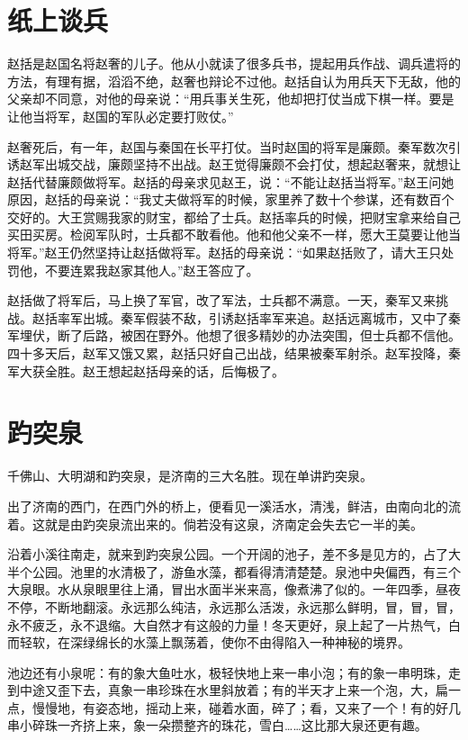 \documentclass[12pt,UTF-8,openany]{ctexbook}
\begin{document}
\chapter{纸上谈兵}

\begin{large}
    
    赵括是赵国名将赵奢的儿子。他从小就读了很多兵书，提起用兵作战、调兵遣将的方法，有理有据，滔滔不绝，赵奢也辩论不过他。赵括自认为用兵天下无敌，他的父亲却不同意，对他的母亲说：“用兵事关生死，他却把打仗当成下棋一样。要是让他当将军，赵国的军队必定要打败仗。”
    
    赵奢死后，有一年，赵国与秦国在长平打仗。当时赵国的将军是廉颇。秦军数次引诱赵军出城交战，廉颇坚持不出战。赵王觉得廉颇不会打仗，想起赵奢来，就想让赵括代替廉颇做将军。赵括的母亲求见赵王，说：“不能让赵括当将军。”赵王问她原因，赵括的母亲说：“我丈夫做将军的时候，家里养了数十个参谋，还有数百个交好的。大王赏赐我家的财宝，都给了士兵。赵括率兵的时候，把财宝拿来给自己买田买房。检阅军队时，士兵都不敢看他。他和他父亲不一样，愿大王莫要让他当将军。”赵王仍然坚持让赵括做将军。赵括的母亲说：“如果赵括败了，请大王只处罚他，不要连累我赵家其他人。”赵王答应了。
    
    赵括做了将军后，马上换了军官，改了军法，士兵都不满意。一天，秦军又来挑战。赵括率军出城。秦军假装不敌，引诱赵括率军来追。赵括远离城市，又中了秦军埋伏，断了后路，被困在野外。他想了很多精妙的办法突围，但士兵都不信他。四十多天后，赵军又饿又累，赵括只好自己出战，结果被秦军射杀。赵军投降，秦军大获全胜。赵王想起赵括母亲的话，后悔极了。
    
\end{large}



\chapter{趵突泉}

\begin{large}
    
    千佛山、大明湖和趵突泉，是济南的三大名胜。现在单讲趵突泉。
    
    出了济南的西门，在西门外的桥上，便看见一溪活水，清浅，鲜洁，由南向北的流着。这就是由趵突泉流出来的。倘若没有这泉，济南定会失去它一半的美。
    
    沿着小溪往南走，就来到趵突泉公园。一个开阔的池子，差不多是见方的，占了大半个公园。池里的水清极了，游鱼水藻，都看得清清楚楚。泉池中央偏西，有三个大泉眼。水从泉眼里往上涌，冒出水面半米来高，像煮沸了似的。一年四季，昼夜不停，不断地翻滚。永远那么纯洁，永远那么活泼，永远那么鲜明，冒，冒，冒，永不疲乏，永不退缩。大自然才有这般的力量！冬天更好，泉上起了一片热气，白而轻软，在深绿绵长的水藻上飘荡着，使你不由得陷入一种神秘的境界。
    
    池边还有小泉呢：有的象大鱼吐水，极轻快地上来一串小泡；有的象一串明珠，走到中途又歪下去，真象一串珍珠在水里斜放着；有的半天才上来一个泡，大，扁一点，慢慢地，有姿态地，摇动上来，碰着水面，碎了；看，又来了一个！有的好几串小碎珠一齐挤上来，象一朵攒整齐的珠花，雪白……这比那大泉还更有趣。
    
\end{large}
\end{document}
